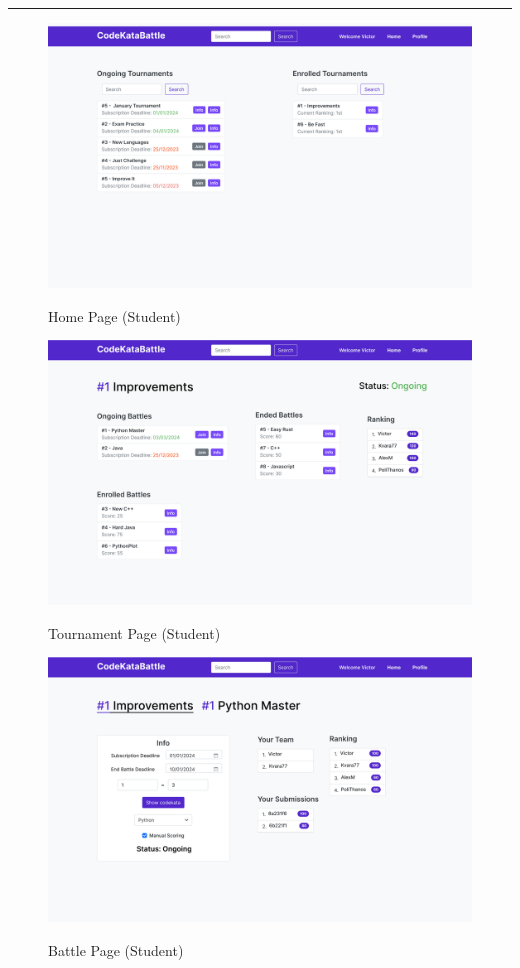 \documentclass{Configuration_Files/Template}
\begin{document}
{\color{bluepoli}\rule{\linewidth}{0.1pt}}

\begin{figure}[H]
\centering
\includegraphics[scale = 0.25]{DD_latex/Images/UI/MainPage_Student.png}\\
\caption{Home Page (Student)}
\end{figure}

\begin{figure}[H]
\centering
\includegraphics[scale = 0.25]{DD_latex/Images/UI/TournamentPage_Student.png}\\
\caption{Tournament Page (Student)}
\end{figure}

\begin{figure}[H]
\centering
\includegraphics[scale = 0.25]{DD_latex/Images/UI/BattlePage_Student.png}\\
\caption{Battle Page (Student)}
\end{figure}
\end{document}
